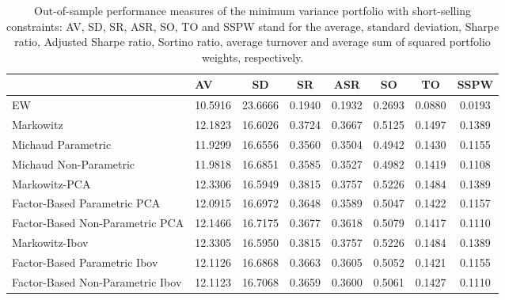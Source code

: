 \begin{table}

\caption{\label{tab:empirical_mvp}Out-of-sample performance measures of the minimum variance portfolio with short-selling constraints: AV, SD, SR, ASR, SO, TO and SSPW stand for the average, standard deviation, Sharpe ratio, Adjusted Sharpe ratio, Sortino ratio, average turnover and average sum of squared portfolio weights, respectively.}
\centering
\begin{tabular}[t]{l|l|c|c|c|c|c|c}
\hline
  & AV & SD & SR & ASR & SO & TO & SSPW\\
\hline
EW & 10.5916 & 23.6666 & 0.1940 & 0.1932 & 0.2693 & 0.0880 & 0.0193\\
\hline
Markowitz & 12.1823 & 16.6026 & 0.3724 & 0.3667 & 0.5125 & 0.1497 & 0.1389\\
\hline
Michaud Parametric & 11.9299 & 16.6556 & 0.3560 & 0.3504 & 0.4942 & 0.1430 & 0.1155\\
\hline
Michaud Non-Parametric & 11.9818 & 16.6851 & 0.3585 & 0.3527 & 0.4982 & 0.1419 & 0.1108\\
\hline
Markowitz-PCA & 12.3306 & 16.5949 & 0.3815 & 0.3757 & 0.5226 & 0.1484 & 0.1389\\
\hline
Factor-Based Parametric PCA & 12.0915 & 16.6972 & 0.3648 & 0.3589 & 0.5047 & 0.1422 & 0.1157\\
\hline
Factor-Based Non-Parametric PCA & 12.1466 & 16.7175 & 0.3677 & 0.3618 & 0.5079 & 0.1417 & 0.1110\\
\hline
Markowitz-Ibov & 12.3305 & 16.5950 & 0.3815 & 0.3757 & 0.5226 & 0.1484 & 0.1389\\
\hline
Factor-Based Parametric Ibov & 12.1126 & 16.6868 & 0.3663 & 0.3605 & 0.5052 & 0.1421 & 0.1155\\
\hline
Factor-Based Non-Parametric Ibov & 12.1123 & 16.7068 & 0.3659 & 0.3600 & 0.5061 & 0.1427 & 0.1110\\
\hline
\end{tabular}
\end{table}
